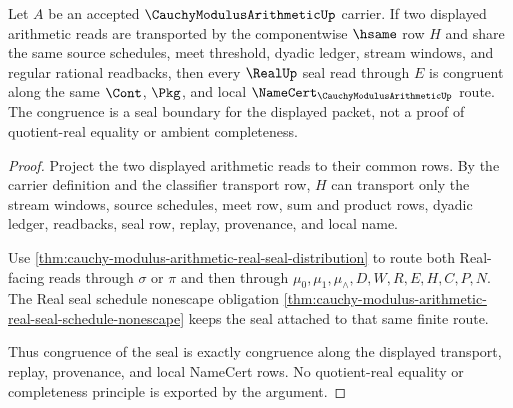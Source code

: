 \begin{theorem}
\label{thm:cauchy-modulus-arithmetic-real-seal-congruence}
Let $A$ be an accepted $\CauchyModulusArithmeticUp$ carrier. If two displayed
arithmetic reads are transported by the componentwise $\hsame$ row $H$ and
share the same source schedules, meet threshold, dyadic ledger, stream
windows, and regular rational readbacks, then every $\RealUp$ seal read
through $E$ is congruent along the same $\Cont$, $\Pkg$, and local
$\NameCert_{\CauchyModulusArithmeticUp}$ route. The congruence is a seal
boundary for the displayed packet, not a proof of quotient-real equality or
ambient completeness.
\end{theorem}
\begin{proof}
Project the two displayed arithmetic reads to their common rows. By the
carrier definition and the classifier transport row, $H$ can transport only
the stream windows, source schedules, meet row, sum and product rows, dyadic
ledger, readbacks, seal row, replay, provenance, and local name.

Use \autoref{thm:cauchy-modulus-arithmetic-real-seal-distribution} to route
both Real-facing reads through $\sigma$ or $\pi$ and then through
$\mu_0,\mu_1,\mu_{\wedge},D,W,R,E,H,C,P,N$. The Real seal schedule nonescape
obligation
\autoref{thm:cauchy-modulus-arithmetic-real-seal-schedule-nonescape} keeps the
seal attached to that same finite route.

Thus congruence of the seal is exactly congruence along the displayed
transport, replay, provenance, and local NameCert rows. No quotient-real
equality or completeness principle is exported by the argument.
\end{proof}

